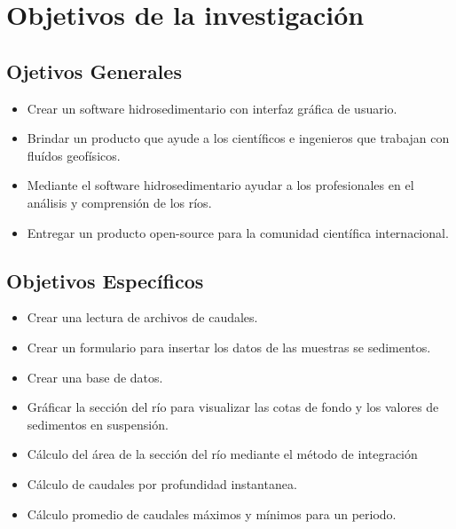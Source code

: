 \documentclass[12pt,a4paper]{report}
\begin{document}


\section{Objetivos de la investigación}
	\subsection{Ojetivos Generales}
	\begin{itemize}
	\item Crear un software hidrosedimentario con interfaz gráfica de usuario.
	\item Brindar un producto que ayude a los científicos e ingenieros que trabajan con fluídos geofísicos.
	\item Mediante el software hidrosedimentario ayudar a los profesionales en el análisis y comprensión de los ríos.
	\item Entregar un producto open-source para la comunidad científica internacional.
	\end{itemize}
	\subsection{Objetivos Específicos}
	\begin{itemize}
	\item Crear una lectura de archivos de caudales.
	\item Crear un formulario para insertar los datos de las muestras se sedimentos.
	\item Crear una base de datos.
	\item Gráficar la sección del río para visualizar las cotas de fondo y los valores de sedimentos en suspensión.
	\item Cálculo del área de la sección del río mediante el método de integración 
	\item Cálculo de caudales por profundidad instantanea.
	\item Cálculo promedio de caudales máximos y mínimos para un periodo.
	\end{itemize}


\end{document}

